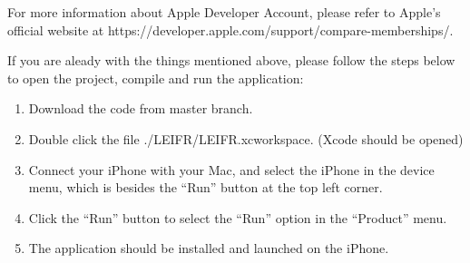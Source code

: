 \documentclass[12pt,a4paper]{article}
\renewcommand\texttt[1]{{\ttfamily\color{textttColor}#1}}
\begin{document}
    For more information about Apple Developer Account, please refer to Apple's official website at https://developer.apple.com/support/compare-memberships/.
    
    If you are aleady with the things mentioned above, please follow the steps below to open the project, compile and run the application:
    
    \begin{enumerate}
        \item Download the code from \texttt{master} branch.
        \item Double click the file \texttt{./LEIFR/LEIFR.xcworkspace}. (Xcode should be opened)
        \item Connect your iPhone with your Mac, and select the iPhone in the device menu, which is besides the ``Run'' button at the top left corner.
        \item Click the ``Run'' button to select the ``Run'' option in the ``Product'' menu. 
        \item The application should be installed and launched on the iPhone.
    \end{enumerate}
    
    \clearpage
    
\end{document}
